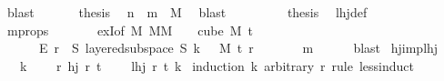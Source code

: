 \begin{isabellebody}
\ blast\isanewline
\ \ \ \isamarkupfalse%
\ \isamarkupfalse%
\ {\isacharquery}{\kern0pt}thesis\ \isamarkupfalse%
\ {\isacartoucheopen}n\ {\isacharplus}{\kern0pt}\ m\ {\isacharequal}{\kern0pt}\ M{\isacharprime}{\kern0pt}{\isacartoucheclose}\ \isamarkupfalse%
\ blast\ \isanewline
\ \ \isamarkupfalse%
\isanewline
\ \ \isamarkupfalse%
\ \isamarkupfalse%
\ {\isacharquery}{\kern0pt}thesis\ \isamarkupfalse%
\ lhj{\isacharunderscore}{\kern0pt}def\ \isanewline
\ \ \ \ \isamarkupfalse%
\ m{\isacharunderscore}{\kern0pt}props\ \isanewline
\ \ \ \ \ \ exI{\isacharbrackleft}{\kern0pt}of\ {\isachardoublequoteopen}{\isasymlambda}M{\isachardot}{\kern0pt}\ {\isasymforall}M{\isacharprime}{\kern0pt}{\isasymge}M{\isachardot}{\kern0pt}\ {\isasymforall}{\isasymchi}{\isachardot}{\kern0pt}\ {\isasymchi}\ {\isasymin}\ cube\ M{\isacharprime}{\kern0pt}\ {\isacharparenleft}{\kern0pt}t\ {\isacharplus}{\kern0pt}\ {}{\isacharparenright}{\kern0pt}\isanewline
\ \ \ \ \ \ {\isasymrightarrow}\isactrlsub E\ {\isacharbraceleft}{\kern0pt}{\isachardot}{\kern0pt}{\isachardot}{\kern0pt}{\isacharless}{\kern0pt}r{\isacharbraceright}{\kern0pt}\ {\isasymlongrightarrow}\ {\isacharparenleft}{\kern0pt}{\isasymexists}S{\isachardot}{\kern0pt}\ layered{\isacharunderscore}{\kern0pt}subspace\ S\ {\isacharparenleft}{\kern0pt}k\ {\isacharplus}{\kern0pt}\ {}{\isacharparenright}{\kern0pt}\ M{\isacharprime}{\kern0pt}\ t\ r\isanewline
\ \ \ \ \ \ {\isasymchi}{\isacharparenright}{\kern0pt}{\isachardoublequoteclose}\ m{\isacharbrackright}{\kern0pt}\isanewline
\ \ \ \ \isamarkupfalse%
\ blast\isanewline
{}\isamarkupfalse%
%
\endisatagproof
{\isafoldproof}%
%
\isadelimproof
\isanewline
%
\endisadelimproof
\isanewline
{}\isamarkupfalse%
\ hj{\isacharunderscore}{\kern0pt}imp{\isacharunderscore}{\kern0pt}lhj{\isacharcolon}{\kern0pt}\ \isanewline
\ \ \ k\ \isanewline
\ \ \ {\isachardoublequoteopen}{\isasymAnd}r{\isacharprime}{\kern0pt}{\isachardot}{\kern0pt}\ hj\ r{\isacharprime}{\kern0pt}\ t{\isachardoublequoteclose}\ \isanewline
\ \ \ {\isachardoublequoteopen}lhj\ r\ t\ k{\isachardoublequoteclose}\isanewline
%
\isadelimproof
%
\endisadelimproof
%
\isatagproof
{}\isamarkupfalse%
\ {\isacharparenleft}{\kern0pt}induction\ k\ arbitrary{\isacharcolon}{\kern0pt}\ r\ rule{\isacharcolon}{\kern0pt}\ less{\isacharunderscore}{\kern0pt}induct{\isacharparenright}{\kern0pt}\isanewline

\end{isabellebody}
